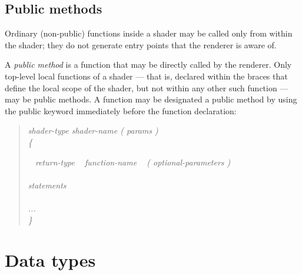 \documentclass[11pt,letterpaper]{book}
\begin{document}
\section{Public methods}
\label{sec:publicmethods}

Ordinary (non-public) functions inside a shader may be called only from
within the shader; they do not generate entry points that the renderer
is aware of.

A \emph{public method} is a function that may be directly called by the
renderer.  Only top-level local functions of a shader --- that is,
declared within the braces that define the local scope of the shader,
but not within any other such function --- may be public methods.  A
function may be designated a public method by using the {\cf public}
keyword immediately before the function declaration:

\begin{quote}
\em shader-type shader-name ( params ) \\
{\rm\cf \{}

 \em ~ return-type ~ function-name ~ {\rm \cf (}
optional-parameters {\rm \cf )} \\
\spc {\rm \cf \{ } \\
\spc\spc statements \\
\spc {\rm \cf \} } \\

\spc ...\\
{\rm\cf \}}
\end{quote}






\chapter{Data types}
\label{chap:types}
\end{document}
